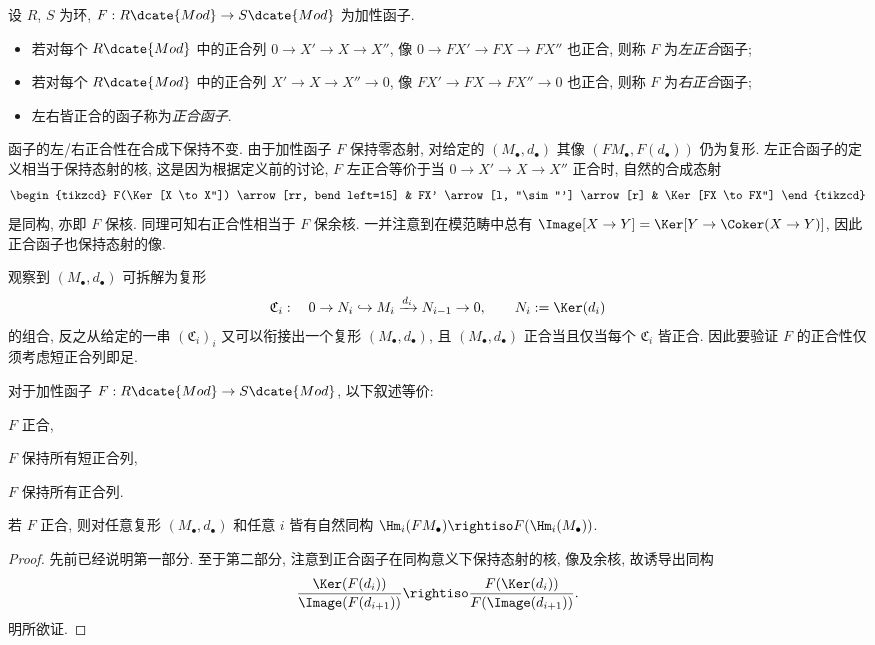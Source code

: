 \begin{definition}
	设 $R$, $S$ 为环, $F: R\dcate{Mod} \to S\dcate{Mod}$ 为加性函子.
	\begin{itemize}
		\item 若对每个 $R\dcate{Mod}$ 中的正合列 $0 \to X' \to X \to X''$, 像 $0 \to FX' \to FX \to FX''$ 也正合, 则称 $F$ 为\emph{左正合}函子;
		\item 若对每个 $R\dcate{Mod}$ 中的正合列 $X' \to X \to X'' \to 0$, 像 $FX' \to FX \to FX'' \to 0$ 也正合, 则称 $F$ 为\emph{右正合}函子;
		\item 左右皆正合的函子称为\emph{正合函子}.
	\end{itemize}
\end{definition}

函子的左/右正合性在合成下保持不变. 由于加性函子 $F$ 保持零态射, 对给定的 $(M_\bullet, d_\bullet)$ 其像 $(FM_\bullet, F(d_\bullet))$ 仍为复形. 左正合函子的定义相当于保持态射的核, 这是因为根据定义前的讨论, $F$ 左正合等价于当 $0 \to X' \to X \to X''$ 正合时, 自然的合成态射
\[\begin{tikzcd}
	F(\Ker[X \to X'']) \arrow[rr, bend left=15] & FX' \arrow[l, "\sim"'] \arrow[r] & \Ker[FX \to FX'']
\end{tikzcd}\]
是同构, 亦即 $F$ 保核. 同理可知右正合性相当于 $F$ 保余核. 一并注意到在模范畴中总有 $\Image[X \to Y] = \Ker[Y \to \Coker(X \to Y)]$, 因此正合函子也保持态射的像.

观察到 $(M_\bullet, d_\bullet)$ 可拆解为复形
\begin{gather*}
	\mathfrak{C}_i: \quad 0 \to N_i \hookrightarrow M_i \xrightarrow{d_i} N_{i-1} \to 0, \qquad N_i := \Ker(d_i)
\end{gather*}
的组合, 反之从给定的一串 $(\mathfrak{C}_i)_i$ 又可以衔接出一个复形 $(M_\bullet, d_\bullet)$, 且 $(M_\bullet, d_\bullet)$ 正合当且仅当每个 $\mathfrak{C}_i$ 皆正合. 因此要验证 $F$ 的正合性仅须考虑短正合列即足.

\begin{proposition}
	对于加性函子 $F: R\dcate{Mod} \to S\dcate{Mod}$, 以下叙述等价: 
	\begin{compactitem}
		\item $F$ 正合,
		\item $F$ 保持所有短正合列,
		\item $F$ 保持所有正合列.
	\end{compactitem}
	若 $F$ 正合, 则对任意复形 $(M_\bullet, d_\bullet)$ 和任意 $i$ 皆有自然同构 $\Hm_i(FM_\bullet) \rightiso F(\Hm_i(M_\bullet))$.
\end{proposition}
\begin{proof}
	先前已经说明第一部分. 至于第二部分, 注意到正合函子在同构意义下保持态射的核, 像及余核, 故诱导出同构
	\[ \frac{\Ker(F(d_i))}{\Image(F(d_{i+1}))} \rightiso \frac{F(\Ker(d_i))}{F(\Image(d_{i+1}))}. \]
	明所欲证.
\end{proof}

